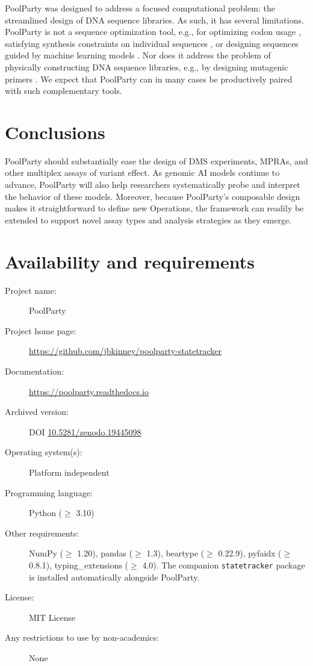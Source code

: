\documentclass[pdflatex,sn-vancouver-num,referee,lineno,oneside]{sn-jnl}
\begin{document}
PoolParty was designed to address a focused computational problem: the streamlined design of DNA sequence libraries. As such, it has several limitations. PoolParty is not a sequence optimization tool, e.g., for optimizing codon usage \citep{Swainston2017rb}, satisfying synthesis constraints on individual sequences \citep{Zulkower2020jk}, or designing sequences guided by machine learning models \citep{Schreiber2025ledidi}. Nor does it address the problem of physically constructing DNA sequence libraries, e.g., by designing mutagenic primers \citep{Hiraga2021yg}. We expect that PoolParty can in many cases be productively paired with such complementary tools.

\section{Conclusions}\label{sec:conclusions}

PoolParty should substantially ease the design of DMS experiments, MPRAs, and other multiplex assays of variant effect. As genomic AI models continue to advance, PoolParty will also help researchers systematically probe and interpret the behavior of these models. Moreover, because PoolParty's composable design makes it straightforward to define new Operations, the framework can readily be extended to support novel assay types and analysis strategies as they emerge.

\backmatter

\section*{Availability and requirements}
\begin{description}
  \item[Project name:] PoolParty
  \item[Project home page:] \url{https://github.com/jbkinney/poolparty-statetracker}
  \item[Documentation:] \url{https://poolparty.readthedocs.io}
  \item[Archived version:] DOI \href{https://doi.org/10.5281/zenodo.19445098}{10.5281/zenodo.19445098}
  \item[Operating system(s):] Platform independent
  \item[Programming language:] Python ($\geq$ 3.10)
  \item[Other requirements:] NumPy ($\geq$ 1.20), pandas ($\geq$ 1.3), beartype ($\geq$ 0.22.9), pyfaidx ($\geq$ 0.8.1), typing\_extensions ($\geq$ 4.0). The companion \texttt{statetracker} package is installed automatically alongside PoolParty.
  \item[License:] MIT License
  \item[Any restrictions to use by non-academics:] None
\end{description}
\end{document}
